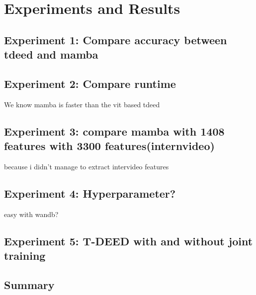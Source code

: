 \chapter{Experiments and Results}
\label{chap:experiments}

\section{Experiment 1: Compare accuracy between tdeed and mamba}
\section{Experiment 2: Compare runtime}
We know mamba is faster than the vit based tdeed
\section{Experiment 3: compare mamba with 1408 features with 3300 features(internvideo)}
because i didn't manage to extract intervideo features
\section{Experiment 4: Hyperparameter?}
easy with wandb?
\section{Experiment 5: T-DEED with and without joint training}
\section{Summary}

